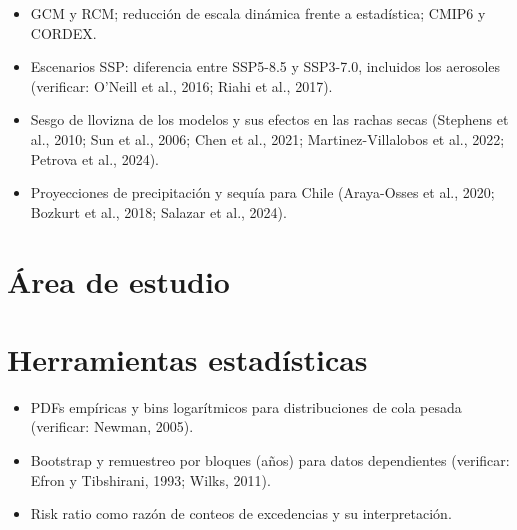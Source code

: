 \begin{itemize}
\tightlist
\item
  GCM y RCM; reducción de escala dinámica frente a estadística; CMIP6 y CORDEX.
\item
  Escenarios SSP: diferencia entre SSP5-8.5 y SSP3-7.0, incluidos los aerosoles (verificar: O'Neill et al., 2016; Riahi et al., 2017).
\item
  Sesgo de llovizna de los modelos y sus efectos en las rachas secas (Stephens et al., 2010; Sun et al., 2006; Chen et al., 2021; Martinez-Villalobos et al., 2022; Petrova et al., 2024).
\item
  Proyecciones de precipitación y sequía para Chile (Araya-Osses et al., 2020; Bozkurt et al., 2018; Salazar et al., 2024).
\end{itemize}

\section{Área de estudio}\label{sec:area}


\section{Herramientas estadísticas}\label{sec:mt_estadistica}

\begin{itemize}
\tightlist
\item
  PDFs empíricas y bins logarítmicos para distribuciones de cola pesada (verificar: Newman, 2005).
\item
  Bootstrap y remuestreo por bloques (años) para datos dependientes (verificar: Efron y Tibshirani, 1993; Wilks, 2011).
\item
  Risk ratio como razón de conteos de excedencias y su interpretación.
\end{itemize}
